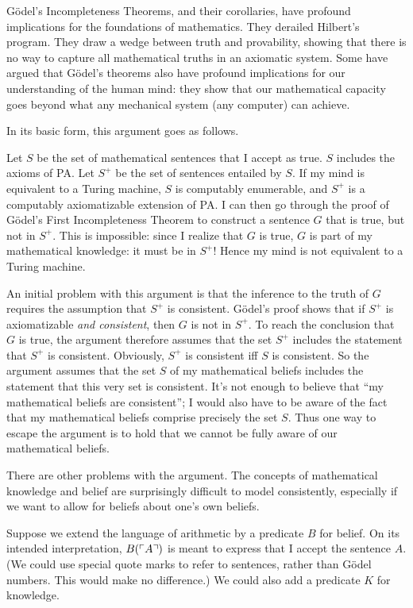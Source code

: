 Gödel's Incompleteness Theorems, and their corollaries, have profound implications for the foundations of mathematics.
They derailed Hilbert's program.
They draw a wedge between truth and provability,
showing that
there is no way to capture all mathematical truths in an axiomatic system.
Some have argued that
Gödel's theorems also have profound implications for our understanding of the human mind:
they show that our mathematical capacity goes beyond what any mechanical system
(any computer) can achieve.

In its basic form,
this argument goes as follows.

Let $S$ be the set of mathematical sentences that I accept as true.
$S$ includes the axioms of PA.
Let $S^+$ be the set of sentences entailed by $S$.
If my mind is equivalent to a Turing machine,
$S$ is computably enumerable,
and $S^+$ is a computably axiomatizable extension of PA.
I can then go through the proof of Gödel's First Incompleteness Theorem
to construct a sentence $G$ that is true,
but not in $S^+$.
This is impossible:
since I realize that $G$ is true,
$G$ is part of my mathematical knowledge:
it must be in $S^+$!
Hence my mind is not equivalent to a Turing machine.

An initial problem with this argument is that
the inference to the truth of $G$
requires the assumption that $S^+$ is consistent.
Gödel's proof shows that if $S^+$ is axiomatizable \emph{and consistent},
then $G$ is not in $S^+$.
To reach the conclusion that $G$ is true,
the argument therefore assumes that
the set $S^+$ includes the statement that $S^+$ is consistent.
Obviously,
$S^+$ is consistent iff $S$ is consistent.
So the argument assumes that
the set $S$ of my mathematical beliefs includes the statement that
this very set is consistent.
It's not enough to believe that
``my mathematical beliefs are consistent'';
I would also have to be aware of the fact that
my mathematical beliefs comprise precisely the set $S$.
Thus one way to escape the argument is to hold that
we cannot be fully aware of our mathematical beliefs.

There are other problems with the argument.
The concepts of mathematical knowledge and belief are surprisingly difficult to model consistently,
especially if we want to allow for beliefs about one's own beliefs.

Suppose we extend the language of arithmetic by a predicate $B$ for belief.
On its intended interpretation,
$B(\ulcorner A \urcorner)$ is meant to express that I accept the sentence $A$.
(We could use special quote marks to refer to sentences,
rather than Gödel numbers.
This would make no difference.)
We could also add a predicate $K$ for knowledge.

